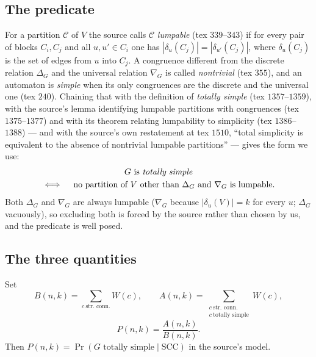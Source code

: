 \documentclass[11pt]{amsart}
\theoremstyle{remark}
\newcommand{\SCC}{\mathrm{SCC}}
\begin{document}
\subsection*{The predicate}
For a partition $\mathcal C$ of $V$ the source calls $\mathcal C$ \emph{lumpable} (tex
$339$--$343$) if for every pair of blocks $C_i,C_j$ and all $u,u'\in C_i$ one has
$|\delta_u(C_j)|=|\delta_{u'}(C_j)|$, where $\delta_u(C_j)$ is the set of edges from $u$
into $C_j$.  A congruence different from the discrete relation $\Delta_G$ and the
universal relation $\nabla_G$ is called \emph{nontrivial} (tex $355$), and an automaton is
\emph{simple} when its only congruences are the discrete and the universal one (tex
$240$).  Chaining that with the definition of \emph{totally simple} (tex $1357$--$1359$),
with the source's lemma identifying lumpable partitions with congruences (tex
$1375$--$1377$) and with its theorem relating lumpability to simplicity (tex
$1386$--$1388$) --- and with the source's own
restatement at tex $1510$, ``total simplicity is equivalent to the absence of nontrivial
lumpable partitions'' --- gives the form we use:
\begin{equation}\label{eq:TS}
\begin{gathered}
  G \text{ is \emph{totally simple}}\\
  \iff\quad
  \text{no partition of $V$ other than $\Delta_G$ and $\nabla_G$ is lumpable.}
\end{gathered}
\end{equation}
Both $\Delta_G$ and $\nabla_G$ are always lumpable ($\nabla_G$ because
$|\delta_u(V)|=k$ for every $u$; $\Delta_G$ vacuously), so excluding both is forced by the
source rather than chosen by us, and the predicate is well posed.

\subsection*{The three quantities}
Set
\begin{equation}\label{eq:ABP}
  B(n,k)=\!\!\sum_{c\ \text{str.\ conn.}}\!\!W(c),
  \qquad
  A(n,k)=\!\!\sum_{\substack{c\ \text{str.\ conn.}\\ c\ \text{totally simple}}}\!\!W(c),
\end{equation}
\begin{equation}\label{eq:P}
  P(n,k)=\frac{A(n,k)}{B(n,k)}.
\end{equation}
Then $P(n,k)=\Pr(G\text{ totally simple}\mid\SCC)$ in the source's model.
\end{document}
